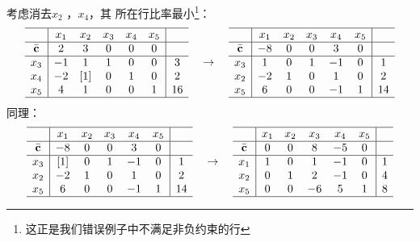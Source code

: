 \documentclass{../mathnotes-art}
\renewcommand{\c}{\mathbf{c}}
\begin{document}
考虑消去\(x_{2}\) ，\(x_{4}\)，其
所在行比率最小\footnote{这正是我们错误例子中不满足非负约束的行}：
\[
    \begin{array}{c|*{5}{c}|c}
        \hline
        & x_1 & x_2 & x_3 & x_4 & x_5 &    \\ \hline
        \bar{\c} & 2  & 3  & 0   & 0   & 0   &    \\ \hline
        x_{3} & -1  & 1   & 1   & 0   & 0   & 3  \\
        x_{4} & -2  & [1]   & 0   & 1   & 0   & 2  \\
        x_{5} & 4   & 1   & 0   & 0   & 1   & 16 \\ \hline
    \end{array}
    \quad \to \quad
    \begin{array}{c|*{5}{c}|c}
        \hline
        & x_1 & x_2 & x_3 & x_4 & x_5 &    \\ \hline
        \bar{\c} & -8  & 0  & 0   & 3   & 0   &    \\ \hline
        x_{3} & 1  & 0   & 1   & -1   & 0   & 1  \\
        x_{2} & -2  & 1   & 0   & 1   & 0   & 2  \\
        x_{5} & 6   & 0   & 0   & -1   & 1   & 14 \\ \hline
    \end{array}
\]
同理：
\[
    \begin{array}{c|*{5}{c}|c}
        \hline
        & x_1 & x_2 & x_3 & x_4 & x_5 &    \\ \hline
        \bar{\c} & -8  & 0  & 0   & 3   & 0   &    \\ \hline
        x_{3} & [1]  & 0   & 1   & -1   & 0   & 1  \\
        x_{2} & -2  & 1   & 0   & 1   & 0   & 2  \\
        x_{5} & 6   & 0   & 0   & -1   & 1   & 14 \\ \hline
    \end{array}
    \quad \to \quad
    \begin{array}{c|*{5}{c}|c}
        \hline
        & x_1 & x_2 & x_3 & x_4 & x_5 &    \\ \hline
        \bar{\c} & 0  & 0  & 8   & -5   & 0   &    \\ \hline
        x_{1} & 1  & 0   & 1   & -1   & 0   & 1  \\
        x_{2} & 0  & 1   & 2   & -1   & 0   & 4  \\
        x_{5} & 0   & 0   & -6   & 5   & 1   & 8 \\ \hline
    \end{array}
\]
\end{document}

